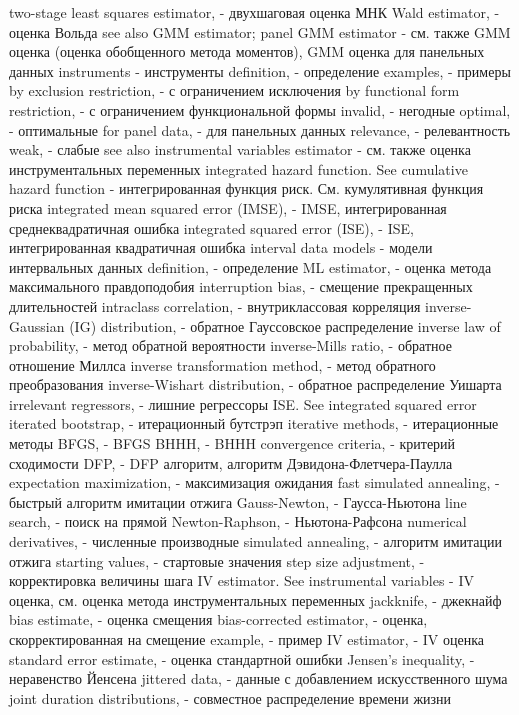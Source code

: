 two-stage least squares estimator, - двухшаговая оценка МНК
Wald estimator, - оценка Вольда
see also GMM estimator; panel GMM estimator - см. также GMM оценка (оценка обобщенного метода моментов), GMM оценка для панельных данных
instruments - инструменты
definition, - определение
examples, - примеры
by exclusion restriction, - с ограничением исключения
by functional form restriction, - с ограничением функциональной формы
invalid, - негодные
optimal, - оптимальные
for panel data, - для панельных данных
relevance, - релевантность
weak, - слабые
see also instrumental variables estimator - см. также оценка инструментальных переменных
integrated hazard function. See cumulative hazard function - интегрированная функция риск. См. кумулятивная функция риска
integrated mean squared error (IMSE), - IMSE, интегрированная среднеквадратичная ошибка
integrated squared error (ISE), - ISE, интегрированная квадратичная ошибка 
interval data models - модели интервальных данных
definition, - определение
ML estimator, - оценка метода максимального правдоподобия
interruption bias, - смещение прекращенных длительностей
intraclass correlation, - внутриклассовая корреляция
inverse-Gaussian (IG) distribution, - обратное Гауссовское распределение 
inverse law of probability, - метод обратной вероятности
inverse-Mills ratio, - обратное отношение Миллса
inverse transformation method, - метод обратного преобразования
inverse-Wishart distribution, - обратное распределение Уишарта
irrelevant regressors, - лишние регрессоры
ISE. See integrated squared error
iterated bootstrap, - итерационный бутстрэп
iterative methods, - итерационные методы
BFGS, - BFGS
BHHH, - BHHH
convergence criteria, - критерий сходимости
DFP, - DFP алгоритм, алгоритм Дэвидона-Флетчера-Паулла
expectation maximization, - максимизация ожидания
fast simulated annealing, - быстрый алгоритм имитации отжига
Gauss-Newton, - Гаусса-Ньютона
line search, - поиск на прямой
Newton-Raphson, - Ньютона-Рафсона
numerical derivatives, - численные производные
simulated annealing, - алгоритм имитации отжига
starting values, - стартовые значения
step size adjustment, - корректировка величины шага
IV estimator. See instrumental variables - IV оценка, см. оценка метода инструментальных переменных
jackknife, - джекнайф
bias estimate, - оценка смещения
bias-corrected estimator, - оценка, скорректированная на смещение
example, - пример
IV estimator, - IV оценка
standard error estimate, - оценка стандартной ошибки
Jensen’s inequality, - неравенство Йенсена
jittered data, - данные с добавлением искусственного шума
joint duration distributions, - совместное распределение времени жизни
